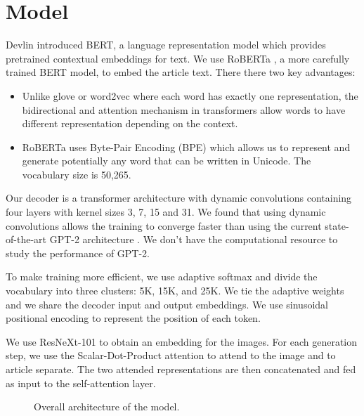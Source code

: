 \documentclass[10pt,twocolumn,letterpaper]{article}
\begin{document}
\section{Model}

Devlin \etal \cite{Devlin2019BERT} introduced BERT, a language representation
model which provides pretrained contextual embeddings for text. We use
RoBERTa \cite{Liu2019RoBERTaAR}, a more carefully trained BERT model, to
embed the article text. There there two key advantages:

\begin{itemize}
   \item Unlike glove \cite{Pennington2014Glove} or word2vec
   \cite{Mikolov2013DistributedRO} where each word has exactly one
   representation, the bidirectional and attention mechanism in transformers
   allow words to have different representation depending on the context.
   \item RoBERTa uses Byte-Pair Encoding (BPE)
   \cite{Sennrich2015NeuralMT,Radford2019LanguageMA} which allows us to
   represent and generate potentially any word that can be written in
   Unicode. The vocabulary size is 50,265.
\end{itemize}

Our decoder is a transformer architecture with dynamic convolutions
\cite{Wu2018PayLA} containing four layers with kernel sizes 3, 7, 15 and 31. We
found that using dynamic convolutions allows the training to converge faster
than using the current state-of-the-art GPT-2 architecture
\cite{Radford2019LanguageMA}. We don't have the computational resource to study
the performance of GPT-2.

To make training more efficient, we use adaptive softmax
\cite{Grave2016EfficientSA} and divide the vocabulary into three clusters: 5K,
15K, and 25K. We tie the adaptive weights and we share the decoder input and
output embeddings. We use sinusoidal positional encoding
\cite{Vaswani2017AttentionIA} to represent the position of each token.

We use ResNeXt-101 \cite{Xie2016AggregatedRT} to obtain an embedding for
the images. For each generation step, we use the Scalar-Dot-Product attention
\cite{Vaswani2017AttentionIA} to attend to the image and to article separate.
The two attended representations are then concatenated and fed as input to
the self-attention layer.

\begin{figure}[t]
   \begin{center}
   \fbox{\rule{0pt}{2in} \rule{.9\linewidth}{0pt}}
   \end{center}
      \caption{Overall architecture of the model.}
   \label{fig:short}
   \end{figure}
\end{document}
